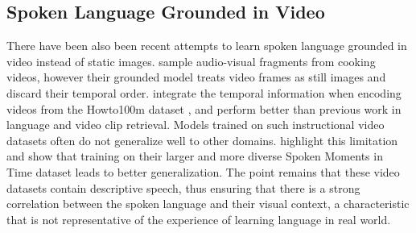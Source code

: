 \subsection{Spoken Language Grounded in Video}
\label{sec:video}
There have been also been recent attempts to learn spoken language grounded
in video instead of static images.  \citet{boggust2019grounding}
sample audio-visual fragments from cooking videos, however their
grounded model treats video frames as still images and discard their
temporal order.
\citet{rouditchenko2020avlnet} integrate the temporal information when
encoding videos from the Howto100m dataset \cite{miech2019howto100m},
and perform better than previous work in language and video clip
retrieval.
Models trained on such instructional video datasets often do not
generalize well to other domains. \citet{monfort2021spokenmoments}
highlight this limitation and show that training on their larger and
more diverse Spoken Moments in Time dataset leads to better
generalization.  The point remains that these video datasets contain
descriptive speech, thus ensuring that there is a strong correlation
between the spoken language and their visual context, a characteristic
that is not representative of the experience of learning language in
real world.

